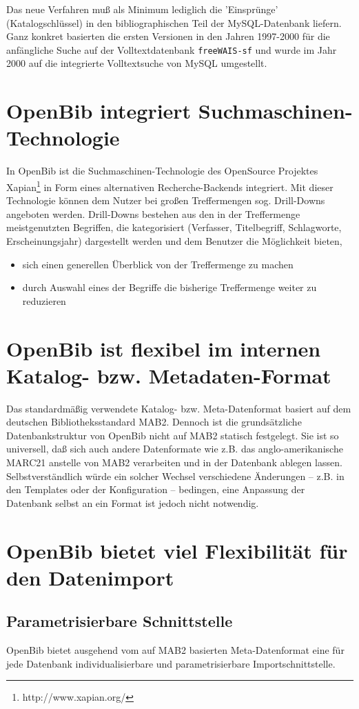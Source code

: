 \documentclass[11pt, twoside, a4paper, BCOR8mm, DIV12, bibtotoc,idxtotoc]{scrbook}
\begin{document}
Das neue Verfahren muß als Minimum lediglich die 'Einsprünge'
(Katalogschlüssel) in den biblio\-gra\-phi\-schen Teil der MySQL-Datenbank
liefern. Ganz konkret basierten die ersten Versionen in den Jahren
1997-2000 für die anfängliche Suche auf der Volltextdatenbank
\texttt{freeWAIS-sf} und wurde im Jahr 2000 auf die integrierte
Volltextsuche von MySQL umgestellt.


\section{OpenBib integriert Suchmaschinen-Technologie}
In OpenBib ist die Suchmaschinen-Technologie des OpenSource Projektes
Xapian\footnote{http://www.xapian.org/} in Form eines alternativen
Recherche-Backends integriert. Mit dieser Technologie können dem Nutzer bei
großen Treffermengen sog. Drill-Downs angeboten werden. Drill-Downs
bestehen aus den in der Treffermenge meistgenutzten Begriffen, die
kategorisiert (Verfasser, Titelbegriff, Schlagworte, Erscheinungsjahr)
dargestellt werden und dem Benutzer die Möglichkeit bieten,
\begin{itemize}
\item sich einen generellen Überblick von der Treffermenge zu machen
\item durch Auswahl eines der Begriffe die bisherige Treffermenge
  weiter zu reduzieren 
\end{itemize}

\section{OpenBib ist flexibel im internen Katalog- bzw. Metadaten-Format}
Das standardmäßig verwendete Katalog- bzw. Meta-Datenformat basiert
auf dem deutschen Bibliotheksstandard MAB2. Dennoch ist die
grundsätzliche Datenbankstruktur von OpenBib nicht auf MAB2 statisch
festgelegt. Sie ist so universell, daß sich auch andere Datenformate
wie z.B. das anglo-amerikanische MARC21 anstelle von MAB2 verarbeiten
und in der Datenbank ablegen lassen. Selbstverständlich würde ein
solcher Wechsel verschiedene Änderungen -- z.B. in den Templates oder
der Konfiguration -- bedingen, eine Anpassung der Datenbank selbst an
ein Format ist jedoch nicht notwendig.

\section{OpenBib bietet viel Flexibilität für den Datenimport }
\subsection{Parametrisierbare Schnittstelle}
OpenBib bietet ausgehend vom auf MAB2 basierten Meta-Datenformat eine
für jede Datenbank individualisierbare und parametrisierbare
Importschnittstelle.
\end{document}

